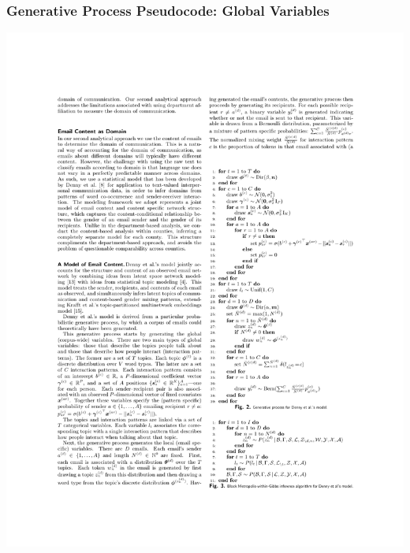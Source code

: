 \documentclass[xcolor={table}, fleqn]{beamer}
\newenvironment{changemargin}[2]{%
  \begin{list}{}{%
    \setlength{\topsep}{0pt}%
    \setlength{\leftmargin}{#1}%
    \setlength{\rightmargin}{#2}%
    \setlength{\listparindent}{\parindent}%
    \setlength{\itemindent}{\parindent}%
    \setlength{\parsep}{\parskip}%
  }%
  \item[]}{\end{list}}
\begin{document}
\begin{frame}\frametitle{Generative Process Pseudocode: Global Variables}
	\begin{changemargin}{-1cm}{ -1cm}
    \centering
	\includegraphics[width=.88\textwidth]{images/Pseudocode1.pdf}
	\end{changemargin} 
\end{frame}
\end{document}
